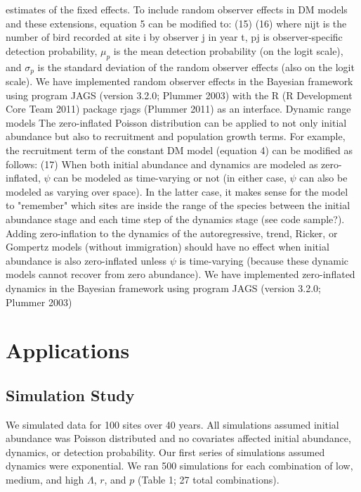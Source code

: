 \documentclass[12pt]{article}
\begin{document}
estimates of the fixed effects.
To include random observer effects in DM models and these extensions,
equation 5 can be modified to:
(15)
(16)
where nijt is the number of bird recorded at site i by observer j in
year t, pj is observer-specific detection probability, $\mu_p$ is the mean
detection probability (on the logit scale), and $\sigma_p$ is the standard
deviation of the random observer effects (also on the logit scale).
We have implemented random observer effects in the Bayesian framework
using program JAGS (version 3.2.0; Plummer 2003) with the R (R
Development Core Team 2011) package rjags (Plummer 2011) as an
interface.
Dynamic range models
The zero-inflated Poisson distribution can be applied to not only
initial abundance but also to recruitment and population growth terms.
For example, the recruitment term of the constant DM model (equation
4) can be modified as follows:
(17)
When both initial abundance and dynamics are modeled as zero-inflated,
$\psi$ can be modeled as time-varying or not (in either case, $\psi$ can also be
modeled as varying over space).  In the latter case, it makes sense
for the model to "remember" which sites are inside the range of the
species between the initial abundance stage and each time step of the
dynamics stage (see code sample?).  Adding zero-inflation to the
dynamics of the autoregressive, trend, Ricker, or Gompertz models
(without immigration) should have no effect when initial abundance is
also zero-inflated unless $\psi$ is time-varying (because these dynamic
models cannot recover from zero abundance).  We have implemented
zero-inflated dynamics in the Bayesian framework using program JAGS
(version 3.2.0; Plummer 2003)


\section{Applications}

\subsection{Simulation Study}


We simulated data for 100 sites over 40 years.  All
simulations assumed initial abundance was Poisson distributed
and no covariates affected initial abundance, dynamics, or
detection probability.  Our first series of simulations
assumed dynamics were exponential.  We ran 500 simulations for
each combination of low, medium, and high $\Lambda$, $r$, and
$p$ (Table 1; 27 total combinations).
\end{document}
